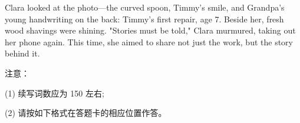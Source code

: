 \documentclass{英语试卷}
\begin{document}
\par Clara looked at the photo—the curved spoon, Timmy's smile, and Grandpa's young handwriting on the back: Timmy's first repair, age 7. Beside her, fresh wood shavings were shining. "Stories must be told," Clara murmured, taking out her phone again. This time, she aimed to share not just the work, but the story behind it.\par
\par 注意：\par
\par (1) 续写词数应为 150 左右;\par
\par (2) 请按如下格式在答题卡的相应位置作答。\par
{}
\end{document}
